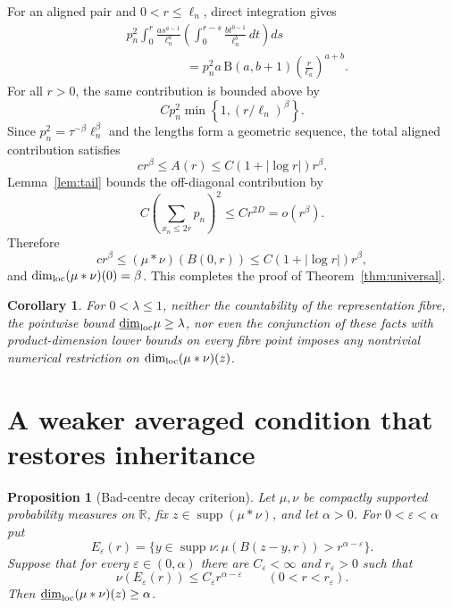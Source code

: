 \documentclass[11pt]{article}
\newtheorem{proposition}{Proposition}
\newtheorem{corollary}{Corollary}
\newcommand{\ldim}{\underline{\operatorname{dim}}_{\rm loc}}
\newcommand{\supp}{\operatorname{supp}}
\begin{document}
For an aligned pair and $0<r\leq\ell_n$, direct integration gives
\begin{align*}
 &p_n^2\int_0^r\frac{a s^{a-1}}{\ell_n^a}
 \left(\int_0^{r-s}\frac{b t^{b-1}}{\ell_n^b}\,dt\right)ds\\
 &\hspace{2cm}=
 p_n^2 a\,\mathrm B(a,b+1)
 \left(\frac r{\ell_n}\right)^{a+b}.
\end{align*}
For all $r>0$, the same contribution is bounded above by
\[
 C p_n^2\min\left\{1,(r/\ell_n)^\beta\right\}.
\]
Since $p_n^2=\tau^{-\beta}\ell_n^\beta$ and the lengths form a geometric
sequence, the total aligned contribution satisfies
\[
 c r^\beta\leq A(r)\leq C(1+|\log r|)r^\beta.
\]
Lemma~\ref{lem:tail} bounds the off-diagonal contribution by
\[
 C\left(\sum_{x_n\leq2r}p_n\right)^2
 \leq C r^{2D}=o(r^\beta).
\]
Therefore
\[
 c r^\beta\leq(\mu*\nu)(B(0,r))
 \leq C(1+|\log r|)r^\beta,
\]
and $\dim_{\rm loc}(\mu*\nu)(0)=\beta$.  This completes the proof of
Theorem~\ref{thm:universal}.

\begin{corollary}\label{cor:none}
For $0<\lambda\leq1$, neither the countability of the representation fibre,
the pointwise bound $\ldim\mu\geq\lambda$, nor even the conjunction of these
facts with product-dimension lower bounds on every fibre point imposes any
nontrivial numerical restriction on $\dim_{\rm loc}(\mu*\nu)(z)$.
\end{corollary}

\section{A weaker averaged condition that restores inheritance}

\begin{proposition}[Bad-centre decay criterion]\label{prop:rescue}
Let $\mu,\nu$ be compactly supported probability measures on $\mathbb R$, fix
$z\in\supp(\mu*\nu)$, and let $\alpha>0$.  For
$0<\varepsilon<\alpha$ put
\[
 E_\varepsilon(r)=
 \{y\in\supp\nu:\mu(B(z-y,r))>r^{\alpha-\varepsilon}\}.
\]
Suppose that for every $\varepsilon\in(0,\alpha)$ there are
$C_\varepsilon<\infty$ and $r_\varepsilon>0$ such that
\begin{equation}\label{eq:baddecay}
 \nu(E_\varepsilon(r))
 \leq C_\varepsilon r^{\alpha-\varepsilon}
 \qquad(0<r<r_\varepsilon).
\end{equation}
Then $\ldim(\mu*\nu)(z)\geq\alpha$.
\end{proposition}
\end{document}
